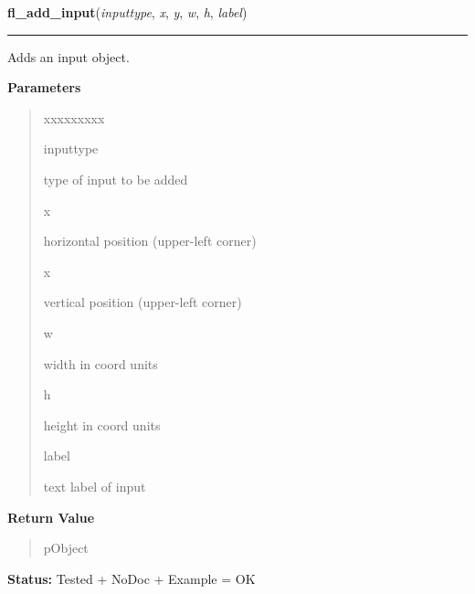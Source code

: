     \label{xformslib:library:fl_add_input}

    \vspace{0.5ex}

\hspace{.8\funcindent}\begin{boxedminipage}{\funcwidth}

    \raggedright \textbf{fl\_add\_input}(\textit{inputtype}, \textit{x}, \textit{y}, \textit{w}, \textit{h}, \textit{label})

    \vspace{-1.5ex}

    \rule{\textwidth}{0.5\fboxrule}
\setlength{\parskip}{2ex}
    Adds an input object.

\setlength{\parskip}{1ex}
      \textbf{Parameters}
      \vspace{-1ex}

      \begin{quote}
        \begin{Ventry}{xxxxxxxxx}

          \item[inputtype]

          type of input to be added

          \item[x]

          horizontal position (upper-left corner)

          \item[x]

          vertical position (upper-left corner)

          \item[w]

          width in coord units

          \item[h]

          height in coord units

          \item[label]

          text label of input

        \end{Ventry}

      \end{quote}

      \textbf{Return Value}
    \vspace{-1ex}

      \begin{quote}
      pObject

      \end{quote}

\textbf{Status:} Tested + NoDoc + Example = OK



    \end{boxedminipage}

